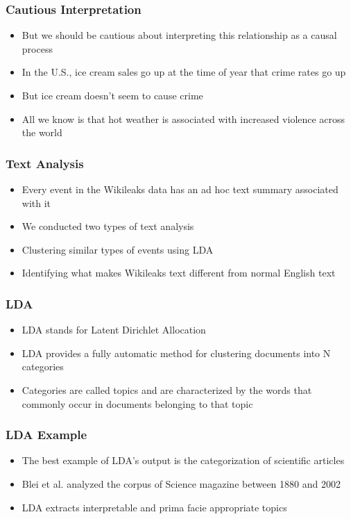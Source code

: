 \documentclass[xcolor=dvipsnames, 9pt]{beamer}
\begin{document}
\begin{frame}[fragile]
  \frametitle{Cautious Interpretation}
  \begin{itemize}
    \item{But we should be cautious about interpreting this relationship as a causal process}
    \item{In the U.S., ice cream sales go up at the time of year that crime rates go up}
    \item{But ice cream doesn't seem to cause crime}
    \item{All we know is that hot weather is associated with increased violence across the world}
  \end{itemize}
\end{frame}

\begin{frame}[fragile]
  \frametitle{Text Analysis}
  
  \begin{itemize}
    \item{Every event in the Wikileaks data has an ad hoc text summary associated with it}
    \item{We conducted two types of text analysis}
    \item{Clustering similar types of events using LDA}
    \item{Identifying what makes Wikileaks text different from normal English text}
  \end{itemize}
\end{frame}

\begin{frame}[fragile]
  \frametitle{LDA}
  \begin{itemize}
    \item{LDA stands for Latent Dirichlet Allocation}
    \item{LDA provides a fully automatic method for clustering documents into N categories}
    \item{Categories are called topics and are characterized by the words that commonly occur in documents belonging to that topic}
  \end{itemize}
\end{frame}

\begin{frame}[fragile]
  \frametitle{LDA Example}
  \begin{itemize}
    \item{The best example of LDA's output is the categorization of scientific articles}
    \item{Blei et al. analyzed the corpus of Science magazine between 1880 and 2002}
    \item{LDA extracts interpretable and prima facie appropriate topics}
  \end{itemize}
\end{frame}
\end{document}
